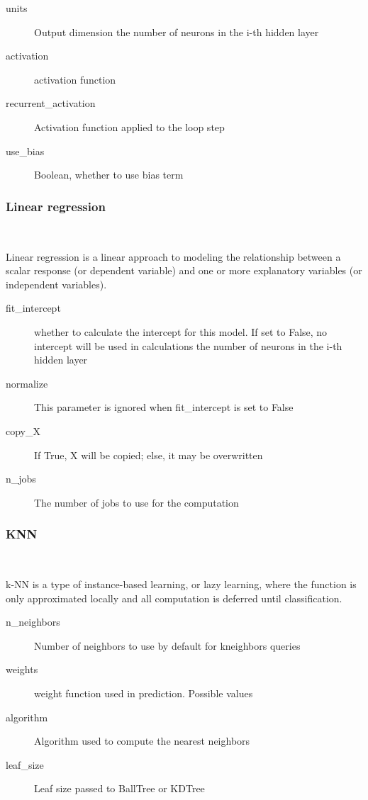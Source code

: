 	
\begin{description}
	\item[units] Output dimension 
		the number of neurons in the i-th hidden layer
	\item[activation] activation function
	\item[recurrent\_activation] Activation function applied to the loop step
	\item[use\_bias] Boolean, whether to use bias term
\end{description}

\subsubsection{Linear regression}
\

Linear regression is a linear approach to 
modeling the relationship between a scalar 
response (or dependent variable) and one 
or more explanatory variables (or 
independent variables). 


\begin{description}
	\item[fit\_intercept] whether to calculate the intercept for this model. If 
	set to False, no intercept will be used in calculations 
	the number of neurons in the i-th hidden layer
	\item[normalize] This parameter is ignored when fit\_intercept is set to 
	False
	\item[copy\_X] If True, X will be copied; else, it may be overwritten
	\item[n\_jobs] The number of jobs to use for the computation
\end{description}

\subsubsection{KNN}
\

k-NN is a type of instance-based learning, 
or lazy learning, where the function is 
only approximated locally and all 
computation is deferred until classification. 


\begin{description}
	\item[n\_neighbors] Number of neighbors to use by default for kneighbors 
	queries
	\item[weights] weight function used in prediction. Possible values
	\item[algorithm] Algorithm used to compute the nearest neighbors
	\item[leaf\_size] Leaf size passed to BallTree or KDTree
\end{description}

